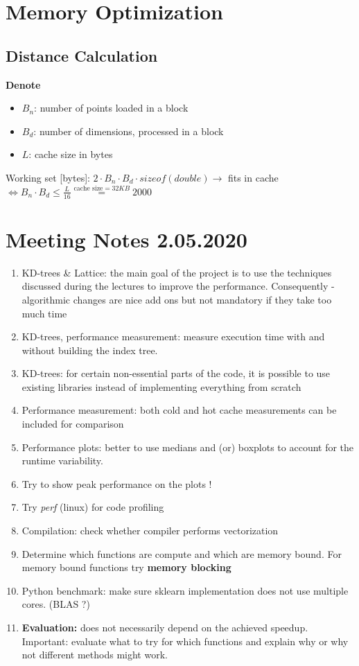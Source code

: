 \documentclass[12pt,a4paper,oneside]{article}
\begin{document}
		\section*{Memory Optimization}
		
		\subsection*{Distance Calculation}
		
		\textbf{Denote}
		\begin{itemize}
			\item $B_n$: number of points loaded in a block
			\item $B_d$: number of dimensions, processed in a block
			\item $L$: cache size in bytes
		\end{itemize}
		Working set [bytes]: $2 \cdot B_n \cdot B_d \cdot sizeof(double) \rightarrow$ fits in cache $\iff B_n \cdot B_d \leq \frac{L}{16} \overset{\text{cache size} =32 KB}{=} 2000 $
		
\newpage
\section*{Meeting Notes 2.05.2020}

\begin{enumerate}
	\item  KD-trees \& Lattice: the main goal of the project is to use the techniques discussed during the lectures to improve the performance. Consequently - algorithmic changes are nice add ons but not mandatory if they take too much time
	\item KD-trees, performance measurement: measure execution time with and without building the index tree.
	\item KD-trees: for certain non-essential parts of the code, it is possible to use existing libraries instead of implementing everything from scratch
	\item Performance measurement: both cold and hot cache measurements can be included for comparison
	\item Performance plots: better to use medians and (or) boxplots to account for the runtime variability.
	\item Try to show peak performance on the plots !
	\item Try \textit{perf} (linux) for code profiling
	\item Compilation: check whether compiler performs vectorization
	\item Determine which functions are compute and which are memory bound. For memory  bound functions try \textbf{memory blocking}
	\item Python benchmark: make sure sklearn implementation does not use multiple cores. (BLAS ?) 
	\item \textbf{Evaluation:} does not necessarily depend on the achieved speedup. Important: evaluate what to try for which functions and explain why or why not different methods might work.
	
\end{enumerate}
			
\end{document}
